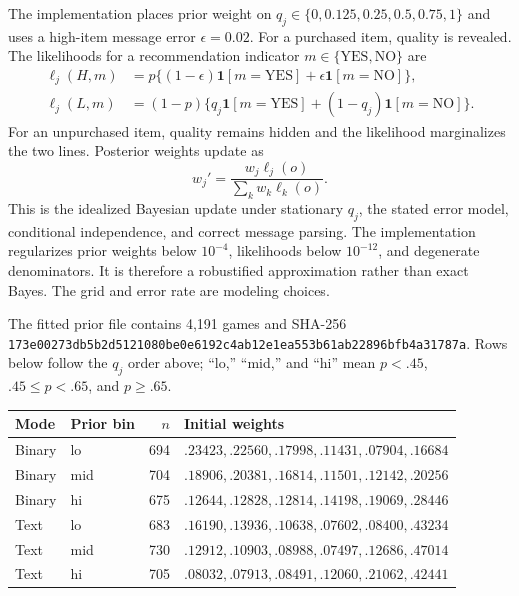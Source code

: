 The implementation places prior weight on
$q_j\in\{0,0.125,0.25,0.5,0.75,1\}$ and uses a high-item message error
$\epsilon=0.02$. For a purchased item, quality is revealed. The likelihoods
for a recommendation indicator $m\in\{\mathrm{YES},\mathrm{NO}\}$ are
\begin{align}
\ell_j(H,m)&=p\{(1-\epsilon)\mathbf1[m=\mathrm{YES}]+\epsilon\mathbf1[m=\mathrm{NO}]\},\\
\ell_j(L,m)&=(1-p)\{q_j\mathbf1[m=\mathrm{YES}]+(1-q_j)\mathbf1[m=\mathrm{NO}]\}.
\end{align}
For an unpurchased item, quality remains hidden and the likelihood marginalizes
the two lines. Posterior weights update as
\begin{equation}
w_j' = \frac{w_j\ell_j(o)}{\sum_k w_k\ell_k(o)}.
\end{equation}
This is the idealized Bayesian update under stationary $q_j$, the stated error
model, conditional independence, and correct message parsing. The implementation
regularizes prior weights below $10^{-4}$, likelihoods below $10^{-12}$, and
degenerate denominators. It is therefore a robustified approximation rather
than exact Bayes. The grid and error rate are modeling choices.

The fitted prior file contains 4,191 games and SHA-256
\texttt{173e00273db5b2d5121080be0e6192c4ab12e1ea553b61ab22896bfb4a31787a}.
Rows below follow the $q_j$ order above; ``lo,'' ``mid,'' and ``hi'' mean
$p<.45$, $.45\leq p<.65$, and $p\geq.65$.
\begin{center}
\scriptsize
\begin{tabular}{@{}llrl@{}}
\toprule
Mode & Prior bin & $n$ & Initial weights \\
\midrule
Binary & lo & 694 & $.23423,.22560,.17998,.11431,.07904,.16684$ \\
Binary & mid & 704 & $.18906,.20381,.16814,.11501,.12142,.20256$ \\
Binary & hi & 675 & $.12644,.12828,.12814,.14198,.19069,.28446$ \\
Text & lo & 683 & $.16190,.13936,.10638,.07602,.08400,.43234$ \\
Text & mid & 730 & $.12912,.10903,.08988,.07497,.12686,.47014$ \\
Text & hi & 705 & $.08032,.07913,.08491,.12060,.21062,.42441$ \\
\bottomrule
\end{tabular}
\end{center}

